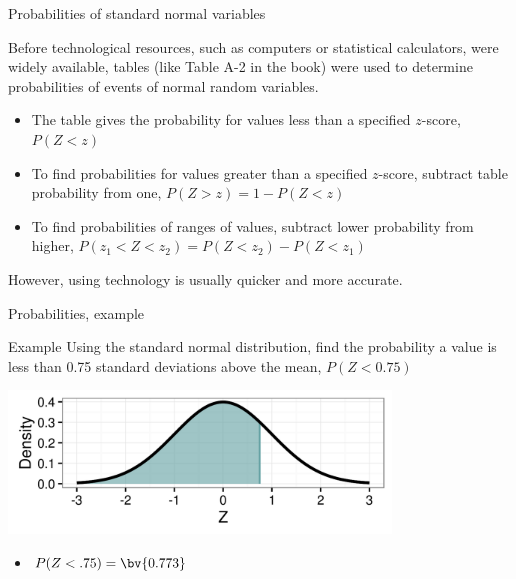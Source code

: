 \documentclass[xcolor=table, handout]{beamer}
\begin{document}
\begin{frame}{Probabilities of standard normal variables}
\begin{block}{}
Before technological resources, such as computers or statistical calculators, were widely available, tables (like Table A-2 in the book) were used to determine probabilities of events of normal random variables.
\begin{itemize}
\pause\item The table gives the probability for values less than a specified $z$-score, $P(Z < z)$
\pause\item To find probabilities for values greater than a specified $z$-score, subtract table probability from one, $P(Z > z) = 1-P(Z<z)$
\pause\item To find probabilities of ranges of values, subtract lower probability from higher, $P(z_1 < Z < z_2) = P(Z < z_2) - P(Z < z_1)$
\end{itemize}
\medskip
\pause However, using technology is usually quicker and more accurate.
\end{block}
\end{frame}


\begin{frame}{Probabilities, example}
\begin{exampleblock}{Example}
Using the standard normal distribution, find the probability a value is less than 0.75 standard deviations above the mean, $P(Z < 0.75)$\\
\smallskip
{\centering
\includegraphics[width=4in]{../images/ch6_ex01}
\par}
\begin{itemize}
\pause\item $P(Z < .75) = \bv{0.773}$
\end{itemize}
\end{exampleblock}
\end{frame}
\end{document}
